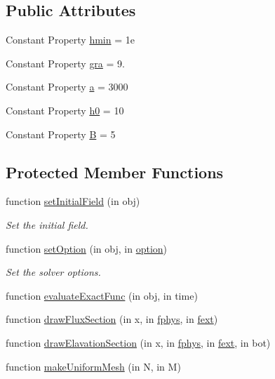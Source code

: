 \subsection*{Public Attributes}
\begin{DoxyCompactItemize}
\item 
Constant Property \hyperlink{class_parabolic_bowl1d_a9d2851339a4d54f816c9e3f93b5c2f70}{hmin} = 1e
\item 
Constant Property \hyperlink{class_parabolic_bowl1d_a152bf3a1a100e0a075fecdf43ce533e5}{gra} = 9.
\item 
Constant Property \hyperlink{class_parabolic_bowl1d_a8ce37a49f081841e51ec00c1942fc15a}{a} = 3000
\item 
Constant Property \hyperlink{class_parabolic_bowl1d_a74bb8fa6705ab95ac310c343635bb023}{h0} = 10
\item 
Constant Property \hyperlink{class_parabolic_bowl1d_a46c8ee4b372cc4f93820303a7a6346c0}{B} = 5
\end{DoxyCompactItemize}
\subsection*{Protected Member Functions}
\begin{DoxyCompactItemize}
\item 
function \hyperlink{class_parabolic_bowl1d_a9398fc3477e482640b615d32304b5607}{set\+Initial\+Field} (in obj)
\begin{DoxyCompactList}\small\item\em Set the initial field. \end{DoxyCompactList}\item 
function \hyperlink{class_parabolic_bowl1d_aa7b7e16cac1c6bf8ac2ba9e03080c9f0}{set\+Option} (in obj, in \hyperlink{class_ndg_phys_af91f4c54b93504e76b38a5693774dff1}{option})
\begin{DoxyCompactList}\small\item\em Set the solver options. \end{DoxyCompactList}\item 
function \hyperlink{class_parabolic_bowl1d_aff0287ba51019e7d837007bf0fa377ec}{evaluate\+Exact\+Func} (in obj, in time)
\item 
function \hyperlink{class_parabolic_bowl1d_a68dd2303dd89df5b163a381d768ff4a8}{draw\+Flux\+Section} (in x, in \hyperlink{class_ndg_phys_a6b25724fc9474d32018439009072f0a9}{fphys}, in \hyperlink{class_ndg_phys_mat_a2b0e8a77bf5f6fe870b12e400d6d83f3}{fext})
\item 
function \hyperlink{class_parabolic_bowl1d_ac8a5f7473584b80cf52a93d03b29784f}{draw\+Elavation\+Section} (in x, in \hyperlink{class_ndg_phys_a6b25724fc9474d32018439009072f0a9}{fphys}, in \hyperlink{class_ndg_phys_mat_a2b0e8a77bf5f6fe870b12e400d6d83f3}{fext}, in bot)
\item 
function \hyperlink{class_parabolic_bowl1d_aa13e4936d6edee12f66e8171031c630b}{make\+Uniform\+Mesh} (in N, in M)
\end{DoxyCompactItemize}
